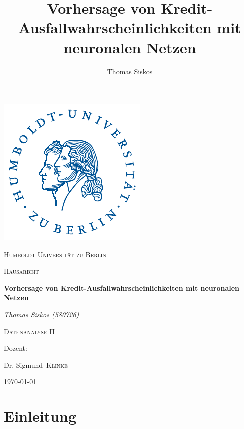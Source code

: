\documentclass{article}
\title{Vorhersage von Kredit-Ausfallwahrscheinlichkeiten mit neuronalen Netzen}
\author{Thomas Siskos}
\date{ }
\begin{document}
\begin{titlepage}
  \begin{center}

  \includegraphics[scale=1.25]{hulogo.pdf} \par
  {\scshape\LARGE Humboldt Universit{\"a}t zu Berlin \par}

  {\scshape\Large Hausarbeit\par}

  {\huge\bfseries Vorhersage von Kredit-Ausfallwahrscheinlichkeiten mit neuronalen Netzen\par}

\vspace{1cm}

  {\Large\itshape Thomas Siskos (580726)\par}

  {\Large\scshape Datenanalyse II\par}

  \vfill
  Dozent: \par
  {\Large Dr. Sigmund~\scshape Klinke \par}
  \vfill
  {\large \today\par}
  \end{center}
\end{titlepage}

\tableofcontents
\listoftables
\listoffigures
\newpage
\section{Einleitung}
\end{document}
